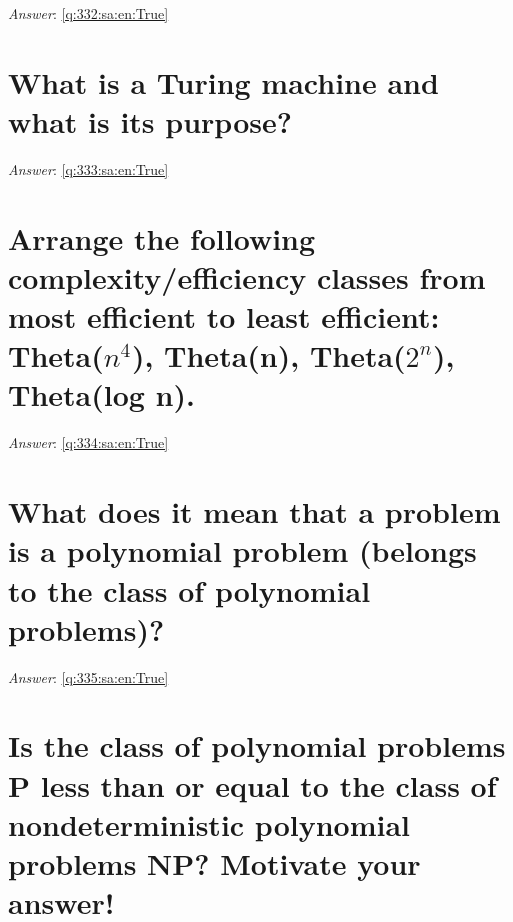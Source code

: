 \documentclass[a4paper,11pt,oneside]{book}
\begin{document}
\begin{sloppypar}
\vspace{1cm}

\textit{Answer}: \autoref{q:332:sa:en:True}



\section{What is a Turing machine and what is its purpose?}

\label{q:333:sa:en:False}

\vspace{2cm}

\noindent\makebox[\textwidth]{\hrulefill}

\vspace{1cm}

\textit{Answer}: \autoref{q:333:sa:en:True}



\section{Arrange the following complexity/efficiency classes from most efficient to least efficient: Theta($n^4$), Theta(n), Theta($2^n$), Theta(log n).}

\label{q:334:sa:en:False}

\vspace{2cm}

\noindent\makebox[\textwidth]{\hrulefill}

\vspace{1cm}

\textit{Answer}: \autoref{q:334:sa:en:True}



\section{What does it mean that a problem is a polynomial problem (belongs to the class of polynomial problems)?}

\label{q:335:sa:en:False}

\vspace{2cm}

\noindent\makebox[\textwidth]{\hrulefill}

\vspace{1cm}

\textit{Answer}: \autoref{q:335:sa:en:True}



\section{Is the class of polynomial problems P less than or equal to the class of nondeterministic polynomial problems NP? Motivate your answer!}


\end{sloppypar}
\end{document}
